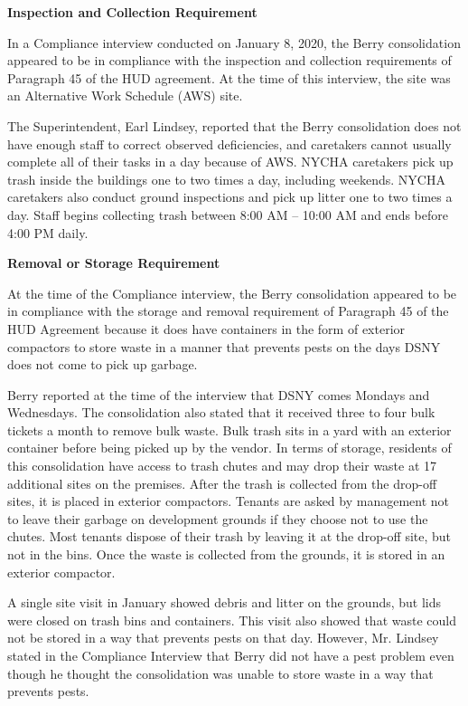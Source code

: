  

\textbf{Inspection and Collection Requirement}

In a Compliance interview conducted on January 8, 2020, the Berry consolidation appeared to be in compliance with the inspection and collection requirements of Paragraph 45 of the HUD agreement. At the time of this interview, the site was an Alternative Work Schedule (AWS) site. 

The Superintendent, Earl Lindsey, reported that the Berry consolidation does not have enough staff to correct observed deficiencies, and caretakers cannot usually complete all of their tasks in a day because of AWS. NYCHA caretakers pick up trash inside the buildings one to two times a day, including weekends. NYCHA caretakers also conduct ground inspections and pick up litter one to two times a day. Staff begins collecting trash between 8:00 AM -- 10:00 AM and ends before 4:00 PM daily.

\textbf{Removal or Storage Requirement}

At the time of the Compliance interview, the Berry consolidation appeared to be in compliance with the storage and removal requirement of Paragraph 45 of the HUD Agreement because it does have containers in the form of exterior compactors to store waste in a manner that prevents pests on the days DSNY does not come to pick up garbage.

Berry reported at the time of the interview that DSNY comes Mondays and Wednesdays. The consolidation also stated that it received three to four bulk tickets a month to remove bulk waste. Bulk trash sits in a yard with an exterior container before being picked up by the vendor. In terms of storage, residents of this consolidation have access to trash chutes and may drop their waste at 17 additional sites on the premises. After the trash is collected from the drop-off sites, it is placed in exterior compactors. Tenants are asked by management not to leave their garbage on development grounds if they choose not to use the chutes. Most tenants dispose of their trash by leaving it at the drop-off site, but not in the bins. Once the waste is collected from the grounds, it is stored in an exterior compactor.  

A single site visit in January showed debris and litter on the grounds, but lids were closed on trash bins and containers.  This visit also showed that waste could not be stored in a way that prevents pests on that day. However, Mr. Lindsey stated in the Compliance Interview that Berry did not have a pest problem even though he thought the consolidation was unable to store waste in a way that prevents pests. 

